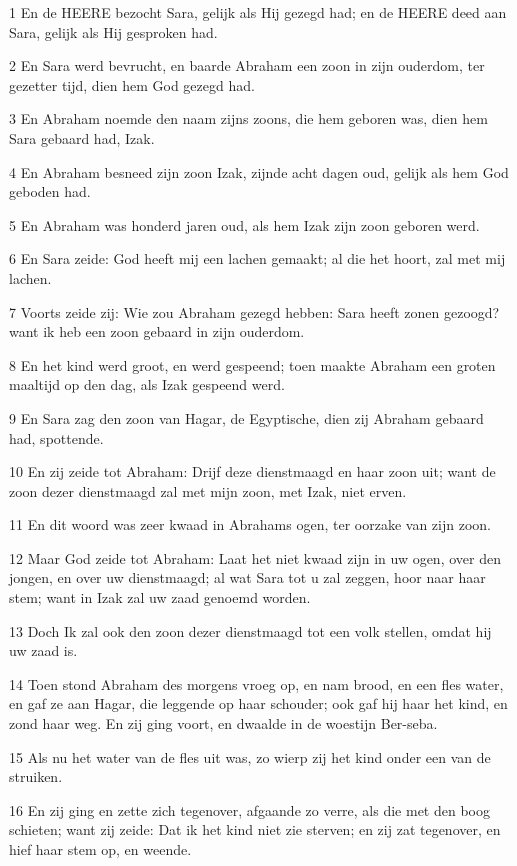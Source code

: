 \par 1 En de HEERE bezocht Sara, gelijk als Hij gezegd had; en de HEERE deed aan Sara, gelijk als Hij gesproken had.
\par 2 En Sara werd bevrucht, en baarde Abraham een zoon in zijn ouderdom, ter gezetter tijd, dien hem God gezegd had.
\par 3 En Abraham noemde den naam zijns zoons, die hem geboren was, dien hem Sara gebaard had, Izak.
\par 4 En Abraham besneed zijn zoon Izak, zijnde acht dagen oud, gelijk als hem God geboden had.
\par 5 En Abraham was honderd jaren oud, als hem Izak zijn zoon geboren werd.
\par 6 En Sara zeide: God heeft mij een lachen gemaakt; al die het hoort, zal met mij lachen.
\par 7 Voorts zeide zij: Wie zou Abraham gezegd hebben: Sara heeft zonen gezoogd? want ik heb een zoon gebaard in zijn ouderdom.
\par 8 En het kind werd groot, en werd gespeend; toen maakte Abraham een groten maaltijd op den dag, als Izak gespeend werd.
\par 9 En Sara zag den zoon van Hagar, de Egyptische, dien zij Abraham gebaard had, spottende.
\par 10 En zij zeide tot Abraham: Drijf deze dienstmaagd en haar zoon uit; want de zoon dezer dienstmaagd zal met mijn zoon, met Izak, niet erven.
\par 11 En dit woord was zeer kwaad in Abrahams ogen, ter oorzake van zijn zoon.
\par 12 Maar God zeide tot Abraham: Laat het niet kwaad zijn in uw ogen, over den jongen, en over uw dienstmaagd; al wat Sara tot u zal zeggen, hoor naar haar stem; want in Izak zal uw zaad genoemd worden.
\par 13 Doch Ik zal ook den zoon dezer dienstmaagd tot een volk stellen, omdat hij uw zaad is.
\par 14 Toen stond Abraham des morgens vroeg op, en nam brood, en een fles water, en gaf ze aan Hagar, die leggende op haar schouder; ook gaf hij haar het kind, en zond haar weg. En zij ging voort, en dwaalde in de woestijn Ber-seba.
\par 15 Als nu het water van de fles uit was, zo wierp zij het kind onder een van de struiken.
\par 16 En zij ging en zette zich tegenover, afgaande zo verre, als die met den boog schieten; want zij zeide: Dat ik het kind niet zie sterven; en zij zat tegenover, en hief haar stem op, en weende.
